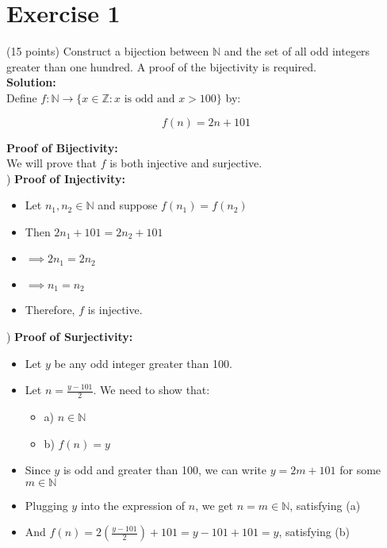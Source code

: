 \documentclass{article}
\begin{document}
\section*{Exercise 1}
(15 points) Construct a bijection between $\mathbb{N}$ and the set of all odd integers greater than one hundred. A proof of the bijectivity is required. \\

\textbf{Solution:} \\

Define $f: \mathbb{N} \rightarrow \{x \in \mathbb{Z} : x \text{ is odd and } x > 100\}$ by:

$$f(n) = 2n + 101$$

\textbf{Proof of Bijectivity:}\\

We will prove that $f$ is both injective and surjective. \\

) \textbf{Proof of Injectivity:}
   \begin{itemize}
    \item Let $n_1, n_2 \in \mathbb{N}$ and suppose $f(n_1) = f(n_2)$
    \item Then $2n_1 + 101 = 2n_2 + 101$
    \item $\implies 2n_1 = 2n_2$
    \item $\implies n_1 = n_2$
    \item Therefore, $f$ is injective.
   \end{itemize}

) \textbf{Proof of Surjectivity:}
   \begin{itemize}
    \item Let $y$ be any odd integer greater than 100.
    \item Let $n = \frac{y - 101}{2}$. We need to show that:
    \begin{itemize}
    \item a) $n \in \mathbb{N}$
    \item b) $f(n) = y$
    \end{itemize}

   \item Since $y$ is odd and greater than 100, we can write $y = 2m + 101$ for some $m \in \mathbb{N}$
   \item Plugging $y$ into the expression of $n$, we get $n = m \in \mathbb{N}$, satisfying (a)
   
   \item And $f(n) = 2(\frac{y - 101}{2}) + 101 = y - 101 + 101 = y$, satisfying (b)

   \end{itemize}
\end{document}
